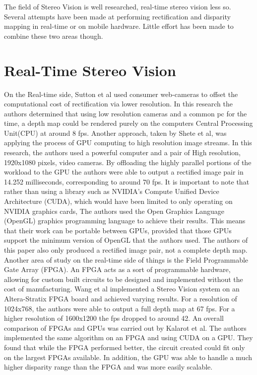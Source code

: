 
The field of Stereo Vision is well researched, real-time stereo vision less so. Several attempts have
been made at performing rectification and disparity mapping in real-time or on mobile hardware.
Little effort has been made to combine these two areas though.
\section{Real-Time Stereo Vision}
On the Real-time side, Sutton et al used consumer web-cameras to offset the computational cost
of rectification via lower resolution. \cite{Sutton} In this research the authors determined that using low
resolution cameras and a common pc for the time, a depth map could be rendered purely on the
computers Central Processing Unit(CPU) at around 8 fps. Another approach, taken by Shete et al,
was applying the process of GPU computing to high resolution image streams.\cite{Shete} In this research, the
authors used a powerful computer and a pair of High resolution, 1920x1080 pixels, video cameras.
By offloading the highly parallel portions of the workload to the GPU the authors were able to
output a rectified image pair in 14.252 milliseconds, corresponding to around 70 fps. It is important
to note that rather than using a library such as NVIDIA’s Compute Unified Device Architecture
(CUDA), which would have been limited to only operating on NVIDIA graphics cards, The authors
used the Open Graphics Language (OpenGL) graphics programming language to achieve their
results. This means that their work can be portable between GPUs, provided that those GPUs
support the minimum version of OpenGL that the authors used. The authors of this paper also
only produced a rectified image pair, not a complete depth map.
Another area of study on the real-time side of things is the Field Programmable Gate Array
(FPGA). An FPGA acts as a sort of programmable hardware, allowing for custom built circuits to
be designed and implemented without the cost of manufacturing. Wang et al implemented a Stereo
Vision system on an Altera-Stratix FPGA board and achieved varying results.\cite{Wang} For a resolution
of 1024x768, the authors were able to output a full depth map at 67 fps. For a higher resolution of
1600x1200 the fps dropped to around 42. An overall comparison of FPGAs and GPUs was carried
out by Kalarot et al. \cite{Kalarot} The authors implemented the same algorithm on an FPGA and using
CUDA on a GPU. They found that while the FPGA performed better, the circuit created could
fit only on the largest FPGAs available. In addition, the GPU was able to handle a much higher
disparity range than the FPGA and was more easily scalable.
